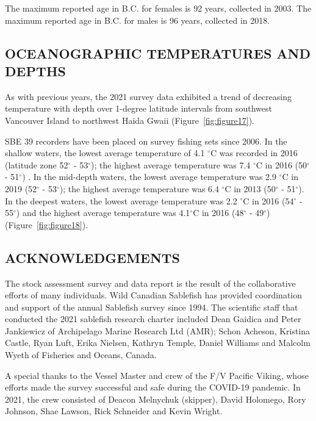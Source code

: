 \documentclass[12pt]{article}\usepackage[]{graphicx}\usepackage[]{color}
\begin{document}
The maximum reported age in B.C. for females is 92 years, collected in 2003. The maximum reported age in B.C. for males is 96 years, collected in 2018.

\hypertarget{oceanographic-temperatures-and-depths}{%
\subsection{OCEANOGRAPHIC TEMPERATURES AND DEPTHS}\label{oceanographic-temperatures-and-depths}}

As with previous years, the 2021 survey data exhibited a trend of decreasing temperature with depth over 1-degree latitude intervals from southwest Vancouver Island to northwest Haida Gwaii (Figure~\ref{fig:figure17}).

SBE 39 recorders have been placed on survey fishing sets since 2006. In the shallow waters, the lowest average temperature of 4.1 \(^\circ\)C was recorded in 2016 (latitude zone 52\(^\circ\) - 53\(^\circ\)); the highest average temperature was 7.4 \(^\circ\)C in 2016 (50\(^\circ\) - 51\(^\circ\)) . In the mid-depth waters, the lowest average temperature was 2.9 \(^\circ\)C in 2019 (52\(^\circ\) - 53\(^\circ\)); the highest average temperature was 6.4 \(^\circ\)C in 2013 (50\(^\circ\) - 51\(^\circ\)). In the deepest waters, the lowest average temperature was 2.2 \(^\circ\)C in 2016 (54\(^\circ\) - 55\(^\circ\)) and the highest average temperature was 4.1\(^\circ\)C in 2016 (48\(^\circ\) - 49\(^\circ\)) (Figure~\ref{fig:figure18}).

\hypertarget{acknowledgements}{%
\subsection{ACKNOWLEDGEMENTS}\label{acknowledgements}}

The stock assessment survey and data report is the result of the collaborative efforts of many individuals. Wild Canadian Sablefish has provided coordination and support of the annual Sablefish survey since 1994. The scientific staff that conducted the 2021 sablefish research charter included Dean Gaidica and Peter Jankiewicz of Archipelago Marine Research Ltd (AMR); Schon Acheson, Kristina Castle, Ryan Luft, Erika Nielsen, Kathryn Temple, Daniel Williams and Malcolm Wyeth of Fisheries and Oceans, Canada.

A special thanks to the Vessel Master and crew of the F/V Pacific Viking, whose efforts made the survey successful and safe during the COVID-19 pandemic. In 2021, the crew consisted of Deacon Melnychuk (skipper), David Holomego, Rory Johnson, Shae Lawson, Rick Schneider and Kevin Wright.
\end{document}
